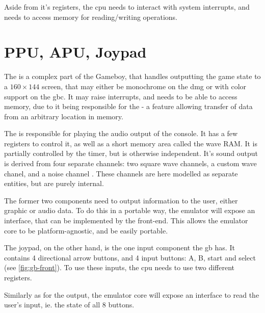 \documentclass[11pt]{report}
\begin{document}
Aside from it's registers, the \gls{cpu} needs to interact with system interrupts, and needs to access memory for reading/writing operations.

%

\section{PPU, APU, Joypad}

The  is a complex part of the Gameboy, that handles outputting the game state to a $160 \times 144$ screen, that may either be monochrome on the \gls{dmg} or with color support on the \gls{gbc}. It may raise interrupts, and needs to be able to access memory, due to it being responsible for the  - a feature allowing transfer of data from an arbitrary location in memory.

The  is responsible for playing the audio output of the console. It has a few registers to control it, as well as a short memory area called the wave RAM. It is partially controlled by the timer, but is otherwise independent. It's sound output is derived from four separate channels: two square wave channels, a custom wave chanel, and a noise channel \cite[Audio]{pandoc}. These channels are here modelled as separate entities, but are purely internal.

The former two components need to output information to the user, either graphic or audio data. To do this in a portable way, the emulator will expose an interface, that can be implemented by the front-end. This allows the emulator core to be platform-agnostic, and be easily portable.

The joypad, on the other hand, is the one input component the \gls{gb} has. It contains 4 directional arrow buttons, and 4 input buttons: A, B, start and select (see \ref{fig:gb-front}). To use these inputs, the \gls{cpu} needs to use two different registers.

Similarly as for the output, the emulator core will expose an interface to read  the user's input, ie. the state of all 8 buttons.
\end{document}

